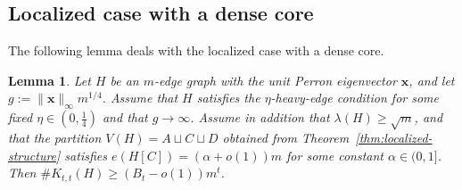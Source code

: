 \documentclass[11pt]{article}
\newtheorem{lemma}[theorem]{Lemma}
\theoremstyle{definition}
\theoremstyle{plain}
\newcommand{\Ktt}{K_{t,t}}
\begin{document}
\subsection{Localized case with a dense core}

The following lemma deals with the localized case with a dense core.

\begin{lemma} 
\label{lem:lemmaC-localized-nonsparse}
Let $H$ be an $m$-edge graph with the unit Perron eigenvector \(\bm{x}\), and let  
$g:=\|\bm{x} \|_\infty m^{1/4}$.  
Assume that \(H\) satisfies the \(\eta\)-heavy-edge condition for some fixed \(\eta\in(0,\tfrac14)\) and that \(g\to\infty\). Assume in addition that \(\lambda(H)\ge\sqrt m\), and that the partition \(V(H)=A\sqcup C\sqcup D\) obtained from Theorem~\ref{thm:localized-structure} satisfies
$e(H[C])=(\alpha+o(1))m$ for some constant \(\alpha\in(0,1]\). Then
$\texttt{\#}\Ktt(H)\ge (B_t-o(1))m^t$.
\end{lemma}
\end{document}

